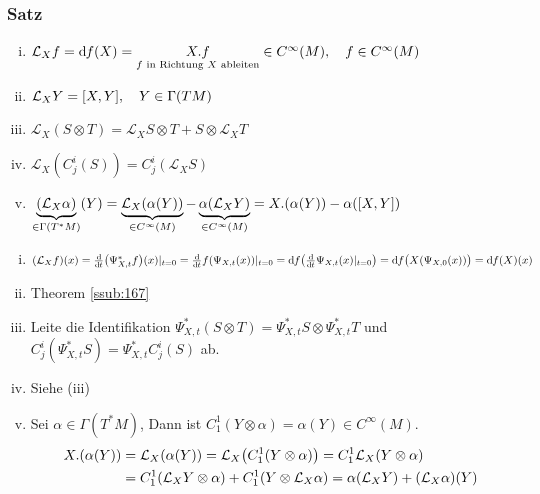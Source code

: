 \subsubsection[Satz:Eigenschaften von $\mathcal{L}_X$]{Satz}
\label{ssub:186}
\begin{enumerate}[(i)]
\item $\mathcal{L}_X f = \mathrm{d}\mkern-1.0mu f(X) = \underset{f\text{ in Richtung }X\text{ ableiten}}{X. f} \in C^\infty(M),\quad f\in C^\infty (M)$
\item $\mathcal{L}_X Y = [X,Y],\quad Y\in \Gamma(TM)$
\item $\mathcal{L}_X (S\otimes T) = \mathcal{L}_X S \otimes T + S\otimes \mathcal{L}_X T$
\item $\mathcal{L}_X(C_j^i(S)) = C_j^i(\mathcal{L}_X S)$
\item $\underbrace{(\mathcal{L}_X \alpha)}_{\in \Gamma(T^* M)}(Y) = \underbrace{\mathcal{L}_X(\alpha(Y))}_{\in C^\infty (M)} - \underbrace{\alpha(\mathcal{L}_X Y)}_{\in C^\infty (M)} = X.(\alpha(Y)) - \alpha([X,Y])$
\end{enumerate}
\begin{enumerate}[(i)]
\item $\enbrace*{\mathcal{L}_X f}(x) = \frac{\mathd}{\mathd t}\enbrace*{\Psi_{X,t}^* f}(x)\vert_{t = 0} = \frac{\mathd}{\mathd t} f\enbrace*{\Psi_{X,t}(x)}\vert_{t = 0} = \mathd f\enbrace*{\frac{\mathd}{\mathd t} \Psi_{X,t}(x)\vert_{t = 0}} = \mathd f\enbrace[\big]{X\enbrace*{\Psi_{X,0}(x)}} = \mathd f(X)(x)$
\item Theorem \ref{ssub:167}
\item Leite die Identifikation $\Psi_{X,t}^*(S\otimes T) = \Psi_{X,t}^* S \otimes \Psi_{X,t}^* T$ und $C_j^i(\Psi_{X,t}^* S) = \Psi_{X,t}^* C_j^i(S)$ ab.
\item Siehe (iii)
\item Sei $\alpha\in \Gamma(T^* M)$, Dann ist $C_1^1(Y\otimes \alpha) = \alpha(Y) \in C^\infty (M)$.
\begin{align*}
X.(\alpha(Y)) &= \mathcal{L}_X (\alpha(Y)) =\mathcal{L}_X \enbrace*{C_1^1(Y\otimes \alpha)} = C_1^1 \mathcal{L}_X \enbrace{Y\otimes \alpha}\\
&= C_1^1 \enbrace{\mathcal{L}_X Y \otimes \alpha} + C_1^1\enbrace{Y\otimes \mathcal{L}_X \alpha} = \alpha(\mathcal{L}_X Y) + (\mathcal{L}_X \alpha)(Y)
\end{align*}
\end{enumerate}

